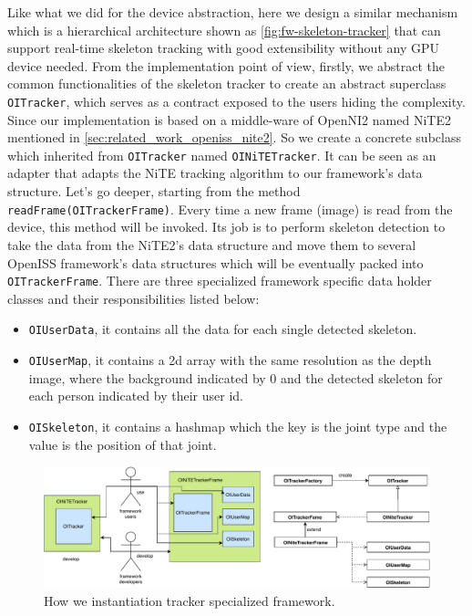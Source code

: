 Like what we did for the device abstraction, here we design a similar mechanism
which is a hierarchical architecture shown as \autoref{fig:fw-skeleton-tracker}
that can support real-time skeleton tracking with good extensibility without
any GPU device needed.
From the implementation point of view, firstly, we abstract the common
functionalities of the skeleton tracker to create an abstract superclass
\texttt{OITracker}, which serves as a contract exposed to the users hiding the
complexity.
Since our implementation is based on a middle-ware of OpenNI2 named NiTE2
mentioned in \autoref{sec:related_work_openiss_nite2}. So we create a concrete
subclass which inherited from \texttt{OITracker} named \texttt{OINiTETracker}.
It can be seen as an adapter that adapts the NiTE tracking algorithm to our
framework's data structure.
Let's go deeper, starting from the method \texttt{readFrame(OITrackerFrame)}.
Every time a new frame (image) is read from the device, this method will be
invoked. Its job is to perform skeleton detection to take the data from the
NiTE2's data structure and move them to several OpenISS framework's data
structures which will be eventually packed into \texttt{OITrackerFrame}.
There are three specialized framework specific data holder classes and their
responsibilities listed below:

\begin{itemize}
    \item \texttt{OIUserData}, it contains all the data for each single
    detected skeleton.
    \item \texttt{OIUserMap}, it contains a 2d array with the same resolution
    as the depth image, where the background indicated by 0 and the detected
    skeleton for each person indicated by their user id.
    \item \texttt{OISkeleton}, it contains a hashmap which the key is the joint
    type and the value is the position of that joint.
\end{itemize}

\begin{figure}
    \centering
    \includegraphics[scale=0.6]{figures/framework_inst_tracker.pdf}
    \caption{How we instantiation tracker specialized framework.}
    \label{fig:fw-skeleton-tracker}
\end{figure}

